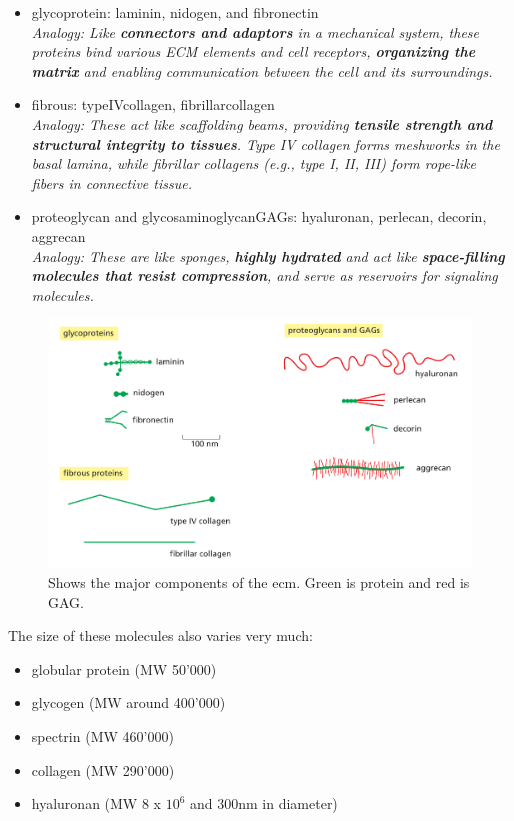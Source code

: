 \documentclass[../main.tex]{subfiles}
\begin{document}
\begin{itemize}
	\item \gls{glycoprotein}: \gls{laminin}, \gls{nidogen}, and \gls{fibronectin}  
	\\ \textit{Analogy: Like \textbf{connectors and adaptors} in a mechanical system, these proteins bind various ECM elements and cell receptors, \textbf{organizing the matrix} and enabling communication between the cell and its surroundings.}
	
	\item \gls{fibrous}: \gls{typeIVcollagen}, \gls{fibrillarcollagen}  
	\\ \textit{Analogy: These act like scaffolding beams, providing \textbf{tensile strength and structural integrity to tissues}. Type IV collagen forms meshworks in the basal lamina, while fibrillar collagens (e.g., type I, II, III) form rope-like fibers in connective tissue.}
	
	\item \gls{proteoglycan} and \gls{glycosaminoglycanGAGs}: \gls{hyaluronan}, \gls{perlecan}, \gls{decorin}, \gls{aggrecan}  
	\\ \textit{Analogy: These are like sponges, \textbf{highly hydrated} and act like \textbf{space-filling molecules that resist compression}, and serve as reservoirs for signaling molecules.}
\end{itemize}

\begin{figure}[H]
	\centering
	\includegraphics[width=0.6\linewidth]{ecm_comp}
	\caption{Shows the major components of the ecm. Green is protein and red is GAG.}
	\label{fig:ecmcomp}
\end{figure}

The size of these molecules also varies very much:
\begin{itemize}
	\item globular protein (MW 50'000)
	\item glycogen (MW around 400'000)
	\item spectrin (MW 460'000)
	\item collagen (MW 290'000)
	\item hyaluronan (MW 8 x $10^{6}$ and 300nm in diameter)
\end{itemize}
\end{document}

